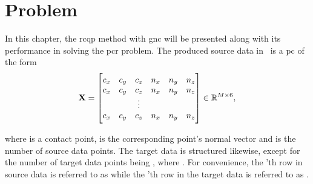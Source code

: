 

\section{Problem}\label{sec:2-pose-estimation-problem}



In this chapter, the \gls{rcqp} method with \gls{gnc} will be presented along with its performance in solving the \gls{pcr} problem. The produced source data  in~ is a \gls{pc} of the form
%
\begin{equation} \label{eq:data-matrix-structure}
	\bm{\mathrm{X}} = 
	\begin{bmatrix}
		c_x & c_y & c_z & n_x & n_y & n_z \\
		c_x & c_y & c_z & n_x & n_y & n_z \\
		 &  & \vdots &  &  &  \\
		c_x & c_y & c_z & n_x & n_y & n_z \\
	\end{bmatrix}\in\mathbb{R}^{M\times 6},
\end{equation}

where  is a contact point,  is the corresponding point's normal vector and  is the number of source data points. The target data  is structured likewise, except for the number of target data points being , where . For convenience, the 'th row in source data is referred to as  while the 'th row in the target data is referred to as . \medskip 

